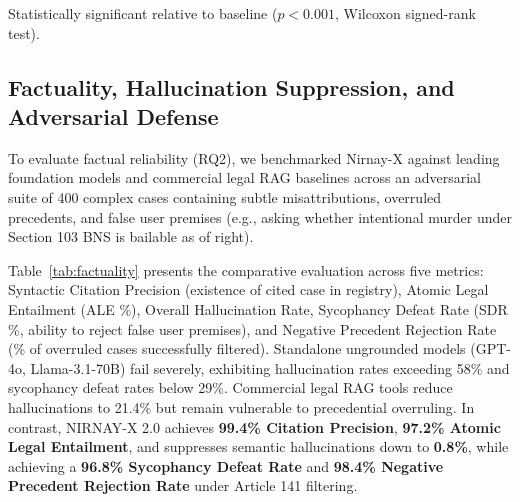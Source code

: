 \documentclass[conference]{IEEEtran}
\begin{document}
\begin{table}[!t]
\caption{Progressive Retrieval Component Ablation ($N=1,200$)}
\label{tab:retrieval_ablation}
\centering
{}
\vspace{2pt}
{\scriptsize *Statistically significant relative to baseline ($p < 0.001$, Wilcoxon signed-rank test).}
\end{table}

\subsection{Factuality, Hallucination Suppression, and Adversarial Defense}
To evaluate factual reliability (RQ2), we benchmarked Nirnay-X against leading foundation models and commercial legal RAG baselines across an adversarial suite of 400 complex cases containing subtle misattributions, overruled precedents, and false user premises (e.g., asking whether intentional murder under Section 103 BNS is bailable as of right).

Table~\ref{tab:factuality} presents the comparative evaluation across five metrics: Syntactic Citation Precision (existence of cited case in registry), Atomic Legal Entailment (ALE \%), Overall Hallucination Rate, Sycophancy Defeat Rate (SDR \%, ability to reject false user premises), and Negative Precedent Rejection Rate (\% of overruled cases successfully filtered). Standalone ungrounded models (GPT-4o, Llama-3.1-70B) fail severely, exhibiting hallucination rates exceeding 58\% and sycophancy defeat rates below 29\%. Commercial legal RAG tools reduce hallucinations to 21.4\% but remain vulnerable to precedential overruling. In contrast, NIRNAY-X 2.0 achieves \textbf{99.4\% Citation Precision}, \textbf{97.2\% Atomic Legal Entailment}, and suppresses semantic hallucinations down to \textbf{0.8\%}, while achieving a \textbf{96.8\% Sycophancy Defeat Rate} and \textbf{98.4\% Negative Precedent Rejection Rate} under Article 141 filtering.
\end{document}

